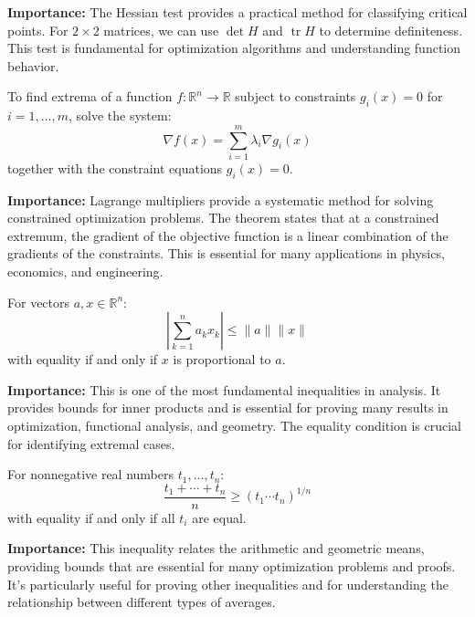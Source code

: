\noindent\textbf{Importance:} The Hessian test provides a practical method for classifying critical points. For $2 \times 2$ matrices, we can use $\det H$ and $\operatorname{tr} H$ to determine definiteness. This test is fundamental for optimization algorithms and understanding function behavior.



\begin{theorem}
To find extrema of a function $f: \mathbb{R}^n \to \mathbb{R}$ subject to constraints $g_i(x) = 0$ for $i = 1, \ldots, m$, solve the system:
\[\nabla f(x) = \sum_{i=1}^m \lambda_i \nabla g_i(x)\]
together with the constraint equations $g_i(x) = 0$.
\end{theorem}

\noindent\textbf{Importance:} Lagrange multipliers provide a systematic method for solving constrained optimization problems. The theorem states that at a constrained extremum, the gradient of the objective function is a linear combination of the gradients of the constraints. This is essential for many applications in physics, economics, and engineering.



\begin{theorem}
For vectors $a, x \in \mathbb{R}^n$:
\[\left|\sum_{k=1}^n a_k x_k\right| \leq \|a\| \|x\|\]
with equality if and only if $x$ is proportional to $a$.
\end{theorem}

\noindent\textbf{Importance:} This is one of the most fundamental inequalities in analysis. It provides bounds for inner products and is essential for proving many results in optimization, functional analysis, and geometry. The equality condition is crucial for identifying extremal cases.



\begin{theorem}
For nonnegative real numbers $t_1, \ldots, t_n$:
\[\frac{t_1 + \cdots + t_n}{n} \geq (t_1 \cdots t_n)^{1/n}\]
with equality if and only if all $t_i$ are equal.
\end{theorem}

\noindent\textbf{Importance:} This inequality relates the arithmetic and geometric means, providing bounds that are essential for many optimization problems and proofs. It's particularly useful for proving other inequalities and for understanding the relationship between different types of averages.




